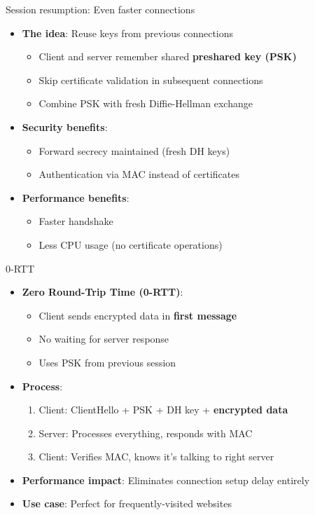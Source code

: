 \documentclass[aspectratio=169, lualatex, handout]{beamer}
\begin{document}
\begin{frame}{Session resumption: Even faster connections}
	\begin{itemize}
		\item \textbf{The idea}: Reuse keys from previous connections
		      \begin{itemize}
			      \item Client and server remember shared \textbf{preshared key (PSK)}
			      \item Skip certificate validation in subsequent connections
			      \item Combine PSK with fresh Diffie-Hellman exchange
		      \end{itemize}
		\item \textbf{Security benefits}:
		      \begin{itemize}
			      \item Forward secrecy maintained (fresh DH keys)
			      \item Authentication via MAC instead of certificates
		      \end{itemize}
		\item \textbf{Performance benefits}:
		      \begin{itemize}
			      \item Faster handshake
			      \item Less CPU usage (no certificate operations)
		      \end{itemize}
	\end{itemize}
\end{frame}

\begin{frame}{0-RTT}
	\begin{itemize}
		\item \textbf{Zero Round-Trip Time (0-RTT)}:
		      \begin{itemize}
			      \item Client sends encrypted data in \textbf{first message}
			      \item No waiting for server response
			      \item Uses PSK from previous session
		      \end{itemize}
		\item \textbf{Process}:
		      \begin{enumerate}
			      \item Client: ClientHello + PSK + DH key + \textbf{encrypted data}
			      \item Server: Processes everything, responds with MAC
			      \item Client: Verifies MAC, knows it's talking to right server
		      \end{enumerate}
		\item \textbf{Performance impact}: Eliminates connection setup delay entirely
		\item \textbf{Use case}: Perfect for frequently-visited websites
	\end{itemize}
\end{frame}
\end{document}
